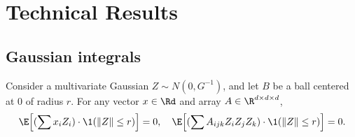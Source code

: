 \documentclass{article}
\begin{document}
\section{Technical Results}

\subsection{Gaussian integrals}
\label{subsec:gaussian-integrals}
Consider a multivariate Gaussian $Z \sim N(0,G^{-1})$, and let $B$ be a ball centered at $0$ of radius $r$. For any vector $x \in \Rd$ and array $A \in \R^{d \times d \times d}$,
\begin{equation}
	\label{eqn:gaussian-integrals-truncated-moments}
	\E\Big[(\sum x_i Z_i) \cdot \1(\|Z\| \leq r)\Big] = 0, \quad \E\Big[(\sum A_{ijk} Z_i Z_jZ_k) \cdot \1(\|Z\| \leq r)\Big] = 0.
\end{equation}



  



	
\end{document}
